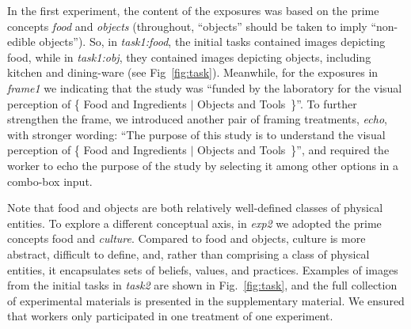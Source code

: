 \documentclass[12pt]{article}
\begin{document}
In the first experiment, the content of the exposures was based on the prime
concepts \textit{food} and \textit{objects} (throughout, ``objects'' should be
taken to imply ``non-edible objects'').  So, 
in \textit{task1:food}, the initial tasks contained images depicting food, 
while in \textit{task1:obj}, they contained images depicting objects, 
including kitchen and dining-ware (see Fig~\ref{fig:task}).  Meanwhile, 
for the exposures in \textit{frame1} we indicating that the study was
``funded by the laboratory for the visual perception of \{ Food and Ingredients
$\vert$ Objects and Tools~\}''.  To further strengthen the frame, we 
introduced another pair of framing treatments, \textit{echo}, with stronger
wording: ``The purpose of this study is to understand the visual perception
of \{ Food and Ingredients $\vert$ Objects and Tools~\}'', and required
the worker to echo the purpose of the study by selecting it among other 
options in a combo-box input.

Note that food and objects are both relatively well-defined classes of 
physical entities.  To explore a different conceptual axis, in 
\textit{exp2} we adopted the prime concepts food and \textit{culture}.
Compared to food and objects, culture is more abstract, difficult to define, 
and, rather than comprising a class of physical entities, it encapsulates
sets of beliefs, values, and practices.  Examples of images from the initial 
tasks in \textit{task2} are shown in Fig.~\ref{fig:task}, and the full 
collection of 
experimental materials is presented in the supplementary material.  We 
ensured that workers only participated in one treatment of one experiment.
\end{document}
